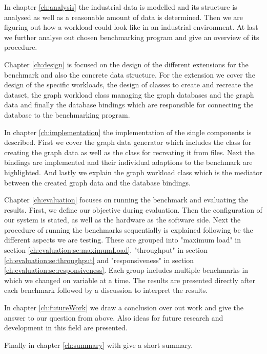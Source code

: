 In chapter \ref{ch:analysis} the industrial data is modelled and its structure is analysed as well as a reasonable amount of data is determined.
Then we are figuring out how a workload could look like in an industrial environment.
At last we further analyse out chosen benchmarking program and give an overview of its procedure.

Chapter \ref{ch:design} is focused on the design of the different extensions for the benchmark and also the concrete data structure.
For the extension we cover the design of the specific workloads,
the design of classes to create and recreate the dataset,
the graph workload class managing the graph databases and the graph data and finally the database bindings which are responsible for connecting the database to the benchmarking program.

In chapter \ref{ch:implementation} the implementation of the single components is described.
First we cover the graph data generator which includes the class for creating the graph data as well as the class for recreating it from files.
Next the bindings are implemented and their individual adaptions to the benchmark are highlighted.
And lastly we explain the graph workload class which is the mediator between the created graph data and the database bindings.

Chapter \ref{ch:evaluation} focuses on running the benchmark and evaluating the results.
First, we define our objective during evaluation.
Then the configuration of our system is stated, as well as the hardware as the software side.
Next the procedure of running the benchmarks sequentially is explained following be the different aspects we are testing.
These are grouped into "maximum load" in section \ref{ch:evaluation:se:maximumLoad}, "throughput" in section \ref{ch:evaluation:se:throughput} and "responsiveness" in section \ref{ch:evaluation:se:responsiveness}.
Each group includes multiple benchmarks in which we changed on variable at a time.
The results are presented directly after each benchmark followed by a discussion to interpret the results.

In chapter \ref{ch:futureWork} we draw a conclusion over out work and give the answer to our question from above.
Also ideas for future research and development in this field are presented.

Finally in chapter \ref{ch:summary} with give a short summary.
